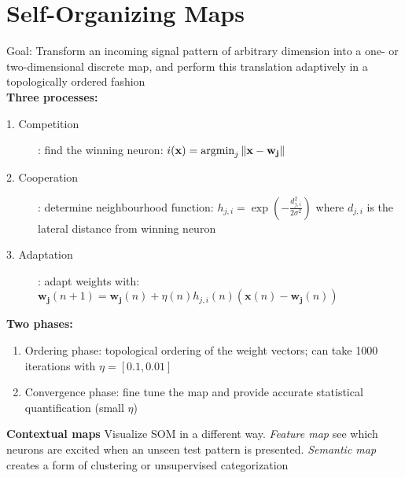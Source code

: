 \documentclass[11pt, twocolumn]{article}
\newcommand{\argmin}{\operatornamewithlimits{argmin}}
\begin{document}
\section{Self-Organizing Maps}
Goal: Transform an incoming signal pattern of arbitrary dimension into a one- or two-dimensional discrete map, and perform this translation adaptively in a topologically ordered fashion \\
\textbf{Three processes:}
\begin{description}
	\item[1. Competition]: find the winning neuron: $i(\mathbf{x})=\argmin_j \Vert \mathbf{x}-\mathbf{w_j}\Vert$
	\item[2. Cooperation]: determine neighbourhood function: $h_{j,i} = \exp(-\frac{d_{j,i}^2}{2\sigma^2})$ \quad where $d_{j,i}$ is the lateral distance from winning neuron
	\item[3. Adaptation]: adapt weights with:\\
	$\mathbf{w_j}(n+1) = \mathbf{w_j}(n)+\eta(n)h_{j,i}(n)(\mathbf{x}(n)-\mathbf{w_j}(n))$
\end{description}
\textbf{Two phases:}
\begin{enumerate}
	\item Ordering phase: topological ordering of the weight vectors; can take 1000 iterations with $\eta=[0.1, 0.01]$
	\item Convergence phase: fine tune the map and provide accurate statistical quantification (small $\eta$)
\end{enumerate}
\textbf{Contextual maps}
Visualize SOM in a different way. \emph{Feature map} see which neurons are excited when an unseen test pattern is presented. \emph{Semantic map} creates a form of clustering or unsupervised categorization
\end{document}
